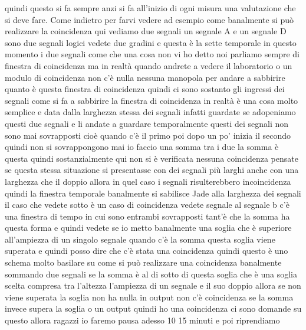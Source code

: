 {quindi questo si fa sempre anzi si fa all'inizio di ogni misura una valutazione che si deve fare. Come indietro per farvi vedere ad esempio come banalmente si può realizzare la coincidenza qui vediamo due segnali un segnale A e un segnale D sono due segnali logici vedete due gradini e questa è la sette temporale in questo momento i due segnali come che una cosa non vi ho detto noi parliamo sempre di finestra di coincidenza ma in realtà quando andrete a vedere il laboratorio o un modulo di coincidenza non c'è nulla nessuna manopola per andare a sabbirire quanto è questa finestra di coincidenza quindi ci sono sostanto gli ingressi dei segnali come si fa a sabbirire la finestra di coincidenza in realtà è una cosa molto semplice e data dalla larghezza stessa dei segnali infatti guardate se adopeniamo questi due segnali e li andate a guardare temporalmente questi dei segnali non sono mai sovrapposti cioè quando c'è il primo poi dopo un po' inizia il secondo quindi non si sovrappongono mai io faccio una somma tra i due la somma è questa quindi sostanzialmente qui non si è verificata nessuna coincidenza pensate se questa stessa situazione si presentasse con dei segnali più larghi anche con una larghezza che il doppio allora in quel caso i segnali risulterebbero incoincidenza quindi la finestra temporale banalmente si sabilisce Jade alla larghezza dei segnali il caso che vedete sotto è un caso di coincidenza vedete segnale al segnale b c'è una finestra di tempo in cui sono entrambi sovrapposti tant'è che la somma ha questa forma e quindi vedete se io metto banalmente una soglia che è superiore all'ampiezza di un singolo segnale quando c'è la somma questa soglia viene superata e quindi posso dire che c'è stata una coincidenza quindi questo è uno schema molto basilare su come si può realizzare una coincidenza banalmente sommando due segnali se la somma è al di sotto di questa soglia che è una soglia scelta compresa tra l'altezza l'ampiezza di un segnale e il suo doppio allora se non viene superata la soglia non ha nulla in output non c'è coincidenza se la somma invece supera la soglia o un output quindi ho una coincidenza ci sono domande su questo allora ragazzi io faremo pausa adesso 10 15 minuti e poi riprendiamo

}
